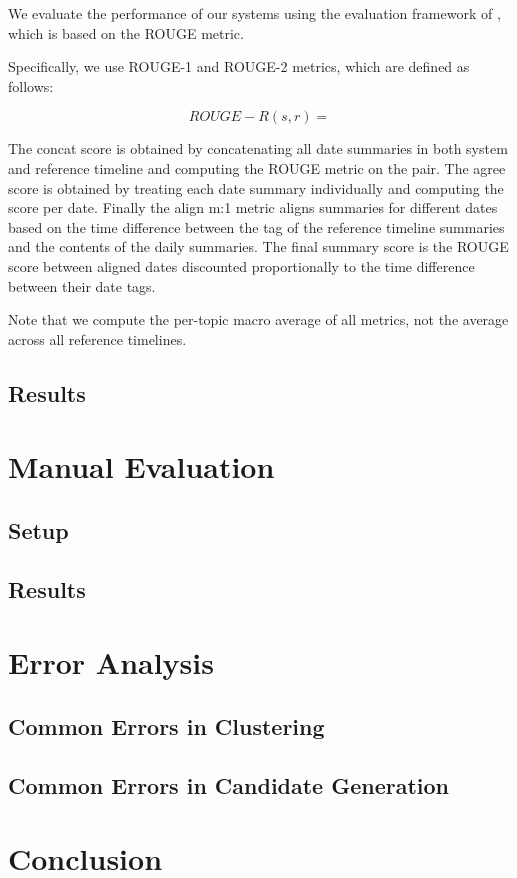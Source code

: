 \documentclass[a4paper,BCOR=10mm]{report}
\begin{document}
We evaluate the performance of our systems using the evaluation framework of \citet{tilse}, which is based on the ROUGE \citep{rouge} metric.

Specifically, we use ROUGE-1 and ROUGE-2 metrics, which are defined as follows:

\begin{displaymath}
    ROUGE-R(s, r) = 
\end{displaymath}

The concat score is obtained by concatenating all date summaries in both system and reference timeline and computing the ROUGE metric on the pair.
The agree score is obtained by treating each date summary individually and computing the score per date.
Finally the align m:1 metric aligns summaries for different dates based on the time difference between the tag of the reference timeline summaries and the contents of the daily summaries. The final summary score is the ROUGE score between aligned dates discounted proportionally to the time difference between their date tags.

Note that we compute the per-topic macro average of all metrics, not the average across all reference timelines.

\section{Results}

\chapter{Manual Evaluation}

\section{Setup}

\section{Results}

\chapter{Error Analysis}

\section{Common Errors in Clustering}

\section{Common Errors in Candidate Generation}


\chapter{Conclusion}


 
\end{document}

